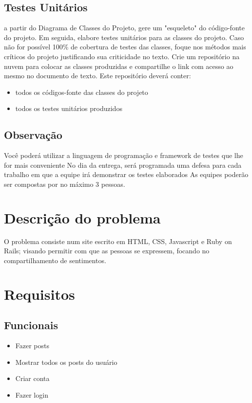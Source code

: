 \documentclass[12pt]{article}
\begin{document}
\subsection{Testes Unitários}
a partir do Diagrama de Classes do Projeto, gere um "esqueleto" do código-fonte do projeto. Em seguida, elabore testes unitários para as classes do projeto. Caso não for possível 100\% de cobertura de testes das classes, foque nos métodos mais críticos do projeto justificando sua criticidade no texto. Crie um repositório na nuvem para colocar as classes produzidas e compartilhe o link com acesso ao mesmo no documento de texto. Este repositório deverá conter:
\begin{itemize}
  \item todos os códigos-fonte das classes do projeto
  \item todos os testes unitários produzidos
\end{itemize}
\subsection{Observação} 
Você poderá utilizar a linguagem de programação e framework de testes que lhe for mais conveniente
No dia da entrega, será programada uma defesa para cada trabalho em que a equipe irá demonstrar os testes elaborados
As equipes poderão ser compostas por no máximo 3 pessoas.

\section{Descrição do problema} \label{sec:firstpage}
O problema consiste num site escrito em HTML, CSS, Javascript e Ruby on Rails; 
visando permitir com que as pessoas se expressem, focando no compartilhamento 
de sentimentos.

\section{Requisitos}
\subsection{Funcionais}
\begin{itemize}
  \item Fazer posts
  \item Mostrar todos os posts do usuário
  \item Criar conta
  \item Fazer login 
\end{itemize}
\end{document}
